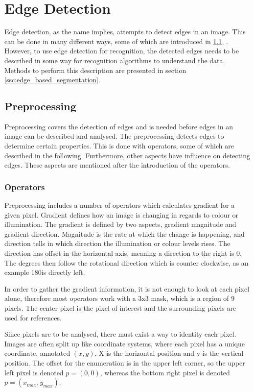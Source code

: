 \section{Edge Detection}
Edge detection, as the name implies, attempts to detect edges in an image. This can be done in many different ways, some of which are introduced in \cref{ssc:edge_preprocessing}, . However, to use edge detection for recognition, the detected edges needs to be described in some way for recognition algorithms to understand the data. Methods to perform this description are presented in section \cref{ssc:edge_based_segmentation}.

\subsection{Preprocessing}\label{ssc:edge_preprocessing}
Preprocessing covers the detection of edges and is needed before edges in an image can be described and analysed. The preprocessing detects edges to determine certain properties. This is done with operators, some of which are described in the following. Furthermore, other aspects have influence on detecting edges. These aspects are mentioned after the introduction of the operators.

\subsubsection{Operators}
Preprocessing includes a number of operators which calculates gradient for a given pixel. Gradient defines how an image is changing in regards to colour or illumination. The gradient is defined by two aspects, gradient magnitude and gradient direction. Magnitude is the rate at which the change is happening, and direction tells in which direction the illumination or colour levels rises. The direction has offset in the horizontal axis, meaning a direction to the right is 0\degree. The degrees then follow the rotational direction which is counter clockwise, as an example 180\degree is directly left.
 
In order to gather the gradient information, it is not enough to look at each pixel alone, therefore most operators work with a 3x3 mask, which is a region of 9 pixels. The center pixel is the pixel of interest and the surrounding pixels are used for references.

Since pixels are to be analysed, there must exist a way to identity each pixel. Images are often split up like coordinate systems, where each pixel has a unique coordinate, annotated $(x,y)$. X is the horizontal position and y is the vertical position. The offset for the enumeration is in the upper left corner, so the upper left pixel is denoted $p=(0,0)$, whereas the bottom right pixel is denoted $p=(x_{max}, y_{max}) $.

